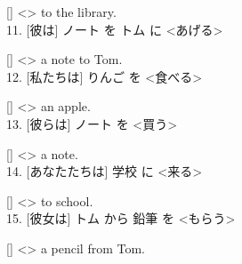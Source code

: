 \documentclass[uplatex,
paper=a4,
fontsize=18pt,
jafontsize=16pt,
number_of_lines=30,
line_length=30zh,
baselineskip=25pt,
]{jlreq}
\begin{document}
  [\hspace{3em}] <\hspace{3em}> to the library.
\\

11.  [彼は] ノート を トム に <あげる>

  [\hspace{3em}] <\hspace{3em}> a note to Tom.
\\

12.  [私たちは] りんご を <食べる>

  [\hspace{3em}] <\hspace{3em}> an apple.
\\

13.  [彼らは] ノート を <買う>

  [\hspace{3em}] <\hspace{3em}> a note.
\\

14.  [あなたたちは] 学校 に <来る>

  [\hspace{3em}] <\hspace{3em}> to school.
\\

15.  [彼女は] トム から 鉛筆 を <もらう>

  [\hspace{3em}] <\hspace{3em}> a pencil from Tom.
\\
\end{document}
